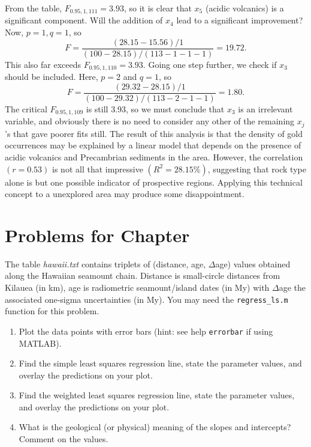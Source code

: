 \begin{example}
From the table, $F_{0.95,1,111} = 3.93$, so it is clear that $x_5$ (acidic volcanics) is a significant component.  Will the 
addition of $x_4$ lead to a significant improvement?  Now, $p = 1, q = 1$, so 
\begin{equation}
F = \frac{(28.15 - 15.56)/1}{(100 - 28.15)/(113 - 1 -1 -1 )} = 19.72.
\end{equation}
This also far exceeds $F_{0.95,1,110} = 3.93$.  Going one step further, we check if $x_3$ should be 
included.  Here, $p = 2$ and $q = 1$, so
\begin{equation}
F = \frac{(29.32 - 28.15)/1}{(100 - 29.32)/(113 - 2 - 1 -1 )} = 1.80.
\end{equation}	 
The critical $F_{0.95,1,109}$ is still 3.93, so we must conclude that $x_3$ is an irrelevant variable, and 
obviously there is no need to consider any other of the remaining $x_j$'s that gave poorer fits still.  The result of this analysis 
is that the density of gold occurrences may be explained by a linear model that depends on the 
presence of acidic volcanics and Precambrian sediments in the area.  
However, the correlation $(r = 0.53)$ is not all that impressive $(R^2 = 28.15\%)$, suggesting that rock type 
alone is but one possible indicator of prospective regions.  Applying this technical concept to a
unexplored area may produce some disappointment.
\end{example}

\clearpage
\section{Problems for Chapter \thechapter}

\begin{problem}
The table \emph{hawaii.txt} contains triplets of (distance, age, $\Delta$age) values
obtained along the Hawaiian seamount chain.  Distance is small-circle distances from Kilauea (in km),
age is radiometric seamount/island dates (in My) with $\Delta$age the associated one-sigma uncertainties (in My).
You may need the \texttt{regress\_ls.m} function for this problem.
\begin{enumerate}[label=\alph*)]
\item  Plot the data points with error bars (hint: see help \texttt{errorbar} if using MATLAB).
\item  Find the simple least squares regression line, state the parameter values, and overlay the predictions on your plot.
\item  Find the weighted least squares regression line, state the parameter values, and overlay the predictions on your plot.
\item What is the geological (or physical) meaning of the slopes and intercepts?  Comment on the values.
\end{enumerate}
\end{problem}

